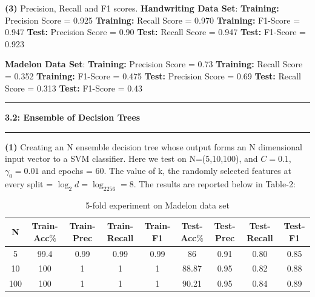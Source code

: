 \documentclass{article}
\newcommand\question[2]{\vspace{.25in}\hrule\textbf{#1: #2}\hrule\vspace{.10in}}
\renewcommand\part[1]{\vspace{.10in}\textbf{(#1)}}
\begin{document}
  \part{3} Precision, Recall and F1 scores.\newline
  \textbf {Handwriting Data Set}: \newline
  \textbf {Training:} Precision Score = 0.925 \newline
  \textbf {Training:} Recall Score = 0.970 \newline
  \textbf {Training:} F1-Score = 0.947 \newline
  \textbf {Test:} Precision Score = 0.90 \newline
  \textbf {Test:} Recall Score = 0.947 \newline
  \textbf {Test:} F1-Score = 0.923 \newline

  \textbf {Madelon Data Set}: \newline
  \textbf {Training:} Precision Score = 0.73 \newline
  \textbf {Training:} Recall Score = 0.352 \newline
  \textbf {Training:} F1-Score = 0.475 \newline
  \textbf {Test:} Precision Score = 0.69 \newline
  \textbf {Test:} Recall Score = 0.313 \newline
  \textbf {Test:} F1-Score = 0.43 \newline

  \question{3.2}{Ensemble of Decision Trees}
  \part{1} Creating an N ensemble decision tree whose output forms an N dimensional input vector to a SVM classifier. Here we test on N=(5,10,100), and $C = 0.1$, $\gamma_0 = 0.01$ and epochs = 60. The value of k, the randomly selected features at every split = $\log_2d = \log_2256 = 8$. The results are reported below in Table-2: \newline

 \begin{longtable}{c|c|c|c|c|c|c|c|c}
  \caption{5-fold experiment on Madelon data set} \\
  \hline\hline
	  N & Train-Acc$\%$ & Train-Prec & Train-Recall & Train-F1 & Test-Acc$\%$ & Test-Prec & Test-Recall & Test-F1 \\[0.5ex]

  \hline
	 5 & 99.4 & 0.99 & 0.99 & 0.99 & 86 & 0.91 & 0.80 & 0.85 \\
	 10 & 100 & 1 & 1 & 1 & 88.87 & 0.95 & 0.82 & 0.88 \\
	 100 & 100 & 1 & 1 & 1 & 90.21 & 0.95 & 0.84 & 0.89 \\ [0.5ex]
  \end{longtable}
\end{document}
